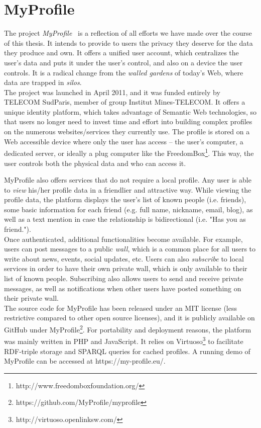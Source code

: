 \section{MyProfile}
The project \textit{MyProfile}~\cite{sambra2011myprofile} is a reflection of all efforts we have made over the course of this thesis. It intends to provide to users the privacy they deserve for the data they produce and own. It offers a unified user account, which centralizes the user's data and puts it under the user's control, and also on a device the user controls. It is a radical change from the \textit{walled gardens} of today's Web, where data are trapped in \textit{silos}.\\

The project was launched in April 2011, and it was funded entirely by TELECOM SudParis, member of group Institut Mines-TELECOM. It offers a unique identity platform, which takes advantage of Semantic Web technologies, so that users no longer need to invest time and effort into building complex profiles on the numerous websites/services they currently use. The profile is stored on a Web accessible device where only the user has access -- the user's computer, a dedicated server, or ideally a plug computer like the FreedomBox\footnote{http://www.freedomboxfoundation.org/}. This way, the user controls both the physical data and who can access it.

MyProfile also offers services that do not require a local profile. Any user is able to \textit{view} his/her profile data in a friendlier and attractive way. While viewing the profile data, the platform displays the user's list of known people (i.e. friends), some basic information for each friend (e.g. full name, nickname, email, blog), as well as a text mention in case the relationship is bidirectional (i.e. "Has you as friend.").\\

Once authenticated, additional functionalities become available. For example, users can post messages to a public \textit{wall}, which is a common place for all users to write about news, events, social updates, etc. Users can also \textit{subscribe} to local services in order to have their own private wall, which is only available to their list of known people. Subscribing also allows users to send and receive private messages, as well as notifications when other users have posted something on their private wall.\\

The source code for MyProfile has been released under an MIT license (less restrictive compared to other open source licenses), and it is publicly available on GitHub under MyProfile\footnote{https://github.com/MyProfile/myprofile}. For portability and deployment reasons, the platform was mainly written in PHP and JavaScript. It relies on Virtuoso\footnote{http://virtuoso.openlinksw.com/} to facilitate RDF-triple storage and SPARQL queries for cached profiles. A running demo of MyProfile can be accessed at https://my-profile.eu/.\\

